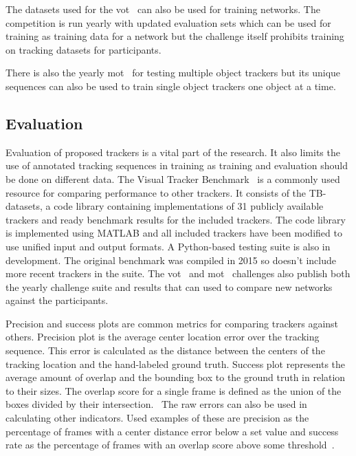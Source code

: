 The datasets used for the \ac{vot}~\cite{VOT} can also be used for training networks. The competition
is run yearly with updated evaluation sets which can be used for training as training
data for a network but the challenge itself prohibits training on tracking datasets for
participants.

There is also the yearly \ac{mot}~\cite{MOT16} for testing multiple object trackers but
its unique sequences can also be used to train single object trackers one object at a
time.

\subsection{Evaluation}
Evaluation of proposed trackers is a vital part of the research. It also limits the use
of annotated tracking sequences in training as training and evaluation should be done
on different data.
The Visual Tracker Benchmark~\cite{VTB} is a commonly used resource for comparing
performance to other trackers. It consists of the TB-datasets, a code library containing
implementations of 31 publicly available trackers and ready benchmark results for the
included trackers. The code library is implemented using MATLAB and all included trackers
have been modified to use unified input and output formats. A Python-based testing suite
is also in development. The original benchmark was compiled in 2015 so doesn't include
more recent trackers in the suite. The \ac{vot}~\cite{VOT} and \ac{mot}~\cite{MOT16}
challenges also publish both the yearly challenge suite and results that can used to
compare new networks against the participants.

Precision and success plots are common metrics for comparing trackers against others.
Precision plot is the average center location error over the tracking sequence. This
error is calculated as the distance between the centers of the tracking location and
the hand-labeled ground truth. Success plot represents the average amount of overlap
and the bounding box to the ground truth in relation to their sizes. The overlap score
for a single frame is defined as the union of the boxes divided by their intersection.~\cite{OT_BENCH}
The raw errors can also be used in calculating other indicators. Used examples of these
are precision as the percentage of frames with a center distance error below a set value
and success rate as the percentage of frames with an overlap score above some threshold~\cite{DEEPTRACK}.
